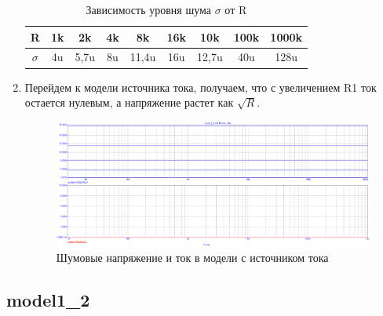 \documentclass[a4paper, 12pt]{article}%
\begin{document}
\begin{enumerate}
\begin{center}
\begin{table}[h!]
    \centering
    \begin{tabular}{|c|c|c|c|c|c|c|c|c|} \hline
        R & 1k & 2k & 4k & 8k & 16k & 10k & 100k & 1000k\\ \hline
        $\sigma$ & 4u & 5,7u & 8u & 11,4u & 16u & 12,7u & 40u & 128u\\ \hline
    \end{tabular}
    \caption{Зависимость уровня шума $\sigma$ от R}
    \label{tab:sR}
\end{table}
\end{center}

\item

Перейдем к модели источника тока, получаем, что с увеличением R1 ток остается нулевым, а напряжение растет как $\sqrt{R}$.

\begin{figure}[h!]
    \centering
    \includegraphics[scale=0.3]{images/mod1_1_3.png}
    \caption{Шумовые напряжение и ток в модели с источником тока}
    \label{fig:R3}
\end{figure}

\end{enumerate}

\subsection*{\textbf{model1\_2}}
\end{document}
